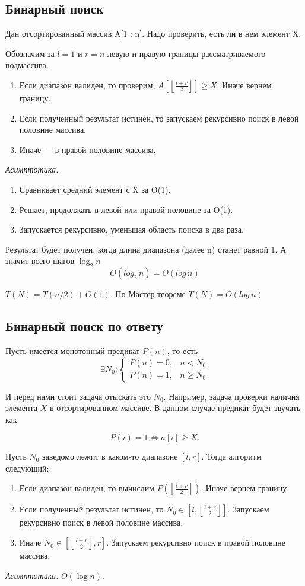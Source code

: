 \subsection*{Бинарный поиск}
\Task Дан отсортированный массив A[1 : n]. Надо проверить, есть ли в нем элемент X. 

\Alg
Обозначим за $l = 1$ и $r = n$ левую и правую границы
рассматриваемого подмассива.
\begin{enumerate}
    \item Если диапазон валиден, то проверим, $ A[ \left\lfloor \frac{l+r}{2} \right\rfloor] \geq X$. 
    Иначе вернем границу.
    \item Если полученный результат истинен, то запускаем рекурсивно
поиск в левой половине массива.
    \item Иначе — в правой половине массива.
\end{enumerate}

\textit{Асимптотика.}
\begin{enumerate}
    \item Сравнивает средний элемент с X за O(1).
    \item Решает, продолжать в левой или правой половине за O(1).
    \item Запускается рекурсивно, уменьшая область поиска в два раза.
\end{enumerate}
Результат будет получен, когда длина диапазона (далее n) станет
равной 1. 
А значит всего шагов $\log_2 n$
$$O(log_2\,n) = O(log\,n)$$

$T(N) = T(n/2) + O(1)$. По Мастер-теореме $T(N) = O(log\,n)$

\subsection*{Бинарный поиск по ответу}
Пусть имеется монотонный предикат \( P(n) \), то есть
$$
\exists N_0 : 
\begin{cases}
P(n) = 0, & n < N_0 \\
P(n) = 1, & n \geq N_0
\end{cases}
$$

И перед нами стоит задача отыскать это \( N_0 \). Например, задача проверки наличия элемента \( X \) в отсортированном массиве. В данном случае предикат будет звучать как 

$$P(i) = 1 \iff a[i] \geq X.$$


\Alg
Пусть \( N_0 \) заведомо лежит в каком-то диапазоне \([l, r]\). Тогда алгоритм следующий:
\begin{enumerate}
    \item Если диапазон валиден, то вычислим \( P\left( \left\lfloor \frac{l+r}{2} \right\rfloor \right) \). Иначе вернем границу.
    \item Если полученный результат истинен, то \( N_0 \in [l, \left\lfloor \frac{l+r}{2} \right\rfloor] \). Запускаем рекурсивно поиск в левой половине массива.
    \item Иначе \( N_0 \in \left[\left\lfloor \frac{l+r}{2} \right\rfloor, r\right] \). Запускаем рекурсивно поиск в правой половине массива.
\end{enumerate}
\textit{Асимптотика.} \( O(\log n) \).
\pagebreak